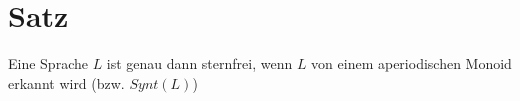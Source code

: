 \section{Satz}
    Eine Sprache $L$ ist genau dann sternfrei, wenn $L$ von einem aperiodischen Monoid erkannt wird (bzw. $Synt(L)$)
